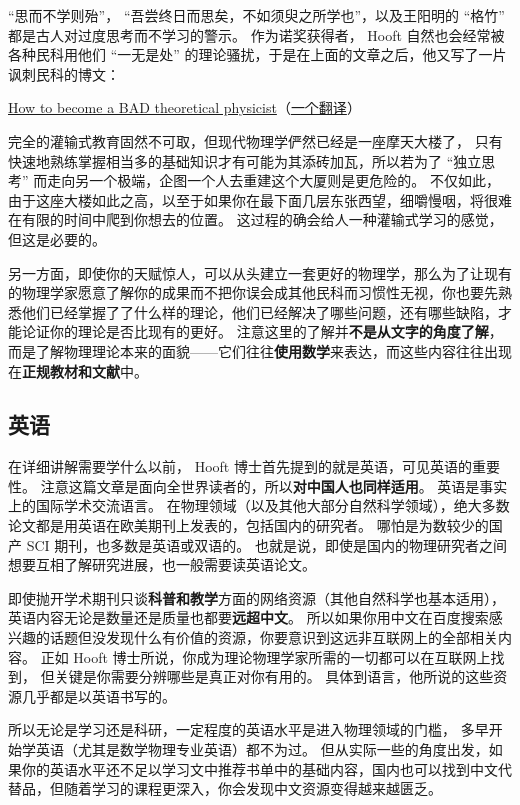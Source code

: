 “思而不学则殆”， “吾尝终日而思矣，不如须臾之所学也”，以及王阳明的 “格竹” 都是古人对过度思考而不学习的警示。 作为诺奖获得者， Hooft 自然也会经常被各种民科用他们 “一无是处” 的理论骚扰，于是在上面的文章之后，他又写了一片讽刺民科的博文：

\href{https://webspace.science.uu.nl/~hooft101/theoristbad.html#:~:text=On\%20your\%20way\%20towards\%20becoming,have\%20your\%20work\%20published\%20anyway.}{How to become a BAD theoretical physicist}（\href{https://zhuanlan.zhihu.com/p/38680467}{一个翻译}）

完全的灌输式教育固然不可取，但现代物理学俨然已经是一座摩天大楼了， 只有快速地熟练掌握相当多的基础知识才有可能为其添砖加瓦，所以若为了 “独立思考” 而走向另一个极端，企图一个人去重建这个大厦则是更危险的。 不仅如此，由于这座大楼如此之高，以至于如果你在最下面几层东张西望，细嚼慢咽，将很难在有限的时间中爬到你想去的位置。 这过程的确会给人一种灌输式学习的感觉，但这是必要的。

另一方面，即使你的天赋惊人，可以从头建立一套更好的物理学，那么为了让现有的物理学家愿意了解你的成果而不把你误会成其他民科而习惯性无视，你也要先熟悉他们已经掌握了了什么样的理论，他们已经解决了哪些问题，还有哪些缺陷，才能论证你的理论是否比现有的更好。 注意这里的了解并\textbf{不是从文字的角度了解}，而是了解物理理论本来的面貌——它们往往\textbf{使用数学}来表达，而这些内容往往出现在\textbf{正规教材和文献}中。

\subsection{英语}
在详细讲解需要学什么以前， Hooft 博士首先提到的就是英语，可见英语的重要性。 注意这篇文章是面向全世界读者的，所以\textbf{对中国人也同样适用}。 英语是事实上的国际学术交流语言。 在物理领域（以及其他大部分自然科学领域），绝大多数论文都是用英语在欧美期刊上发表的，包括国内的研究者。 哪怕是为数较少的国产 SCI 期刊，也多数是英语或双语的。 也就是说，即使是国内的物理研究者之间想要互相了解研究进展，也一般需要读英语论文。

即使抛开学术期刊只谈\textbf{科普和教学}方面的网络资源（其他自然科学也基本适用），英语内容无论是数量还是质量也都要\textbf{远超中文}。 所以如果你用中文在百度搜索感兴趣的话题但没发现什么有价值的资源，你要意识到这远非互联网上的全部相关内容。 正如 Hooft 博士所说，你成为理论物理学家所需的一切都可以在互联网上找到， 但关键是你需要分辨哪些是真正对你有用的。 具体到语言，他所说的这些资源几乎都是以英语书写的。

所以无论是学习还是科研，一定程度的英语水平是进入物理领域的门槛， 多早开始学英语（尤其是数学物理专业英语）都不为过。 但从实际一些的角度出发，如果你的英语水平还不足以学习文中推荐书单中的基础内容，国内也可以找到中文代替品，但随着学习的课程更深入，你会发现中文资源变得越来越匮乏。

